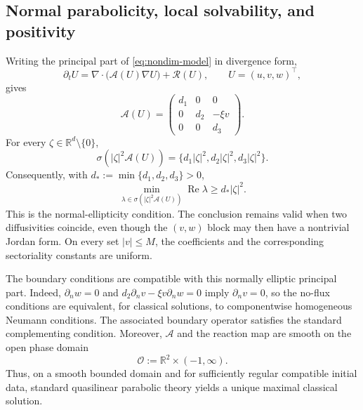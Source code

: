 \documentclass[a4paper,fleqn,longmktitle]{cas-sc}
\theoremstyle{plain}
\theoremstyle{definition}
\numberwithin{equation}{section}
\begin{document}
\subsection{Normal parabolicity, local solvability, and positivity}
\label{app:normal-parabolicity}
Writing the principal part of \eqref{eq:nondim-model} in divergence form,
\[
 \partial_tU=\nabla\cdot\bigl(\mathcal A(U)\nabla U\bigr)
 +\mathcal R(U),
 \qquad U=(u,v,w)^\top,
\]
gives
\[
\mathcal A(U)=
\begin{pmatrix}
d_1&0&0\\
0&d_2&-\xi v\\
0&0&d_3
\end{pmatrix}.
\]
For every $\zeta\in\mathbb R^d\setminus\{0\}$,
\[
 \sigma\!\left(|\zeta|^2\mathcal A(U)\right)
 =
 \{d_1|\zeta|^2,d_2|\zeta|^2,d_3|\zeta|^2\}.
\]
Consequently, with $d_*:=\min\{d_1,d_2,d_3\}>0$,
\[
 \min_{\lambda\in
 \sigma(|\zeta|^2\mathcal A(U))}
 \operatorname{Re}\lambda
 \ge d_*|\zeta|^2 .
\]
This is the normal-ellipticity condition. The conclusion
remains valid when two diffusivities coincide, even though the $(v,w)$ block
may then have a nontrivial Jordan form. On every set $|v|\le M$, the
coefficients and the corresponding sectoriality constants are uniform.

The boundary conditions are compatible with this normally elliptic principal
part. Indeed, $\partial_nw=0$ and
$d_2\partial_nv-\xi v\partial_nw=0$ imply $\partial_nv=0$, so the no-flux
conditions are equivalent, for classical solutions, to componentwise
homogeneous Neumann conditions. The associated boundary operator satisfies
the standard complementing condition. Moreover, $\mathcal A$ and the reaction
map are smooth on the open phase domain
\[
 \mathcal O:=\mathbb R^2\times(-1,\infty).
\]
Thus, on a smooth bounded domain and for sufficiently regular compatible
initial data, standard quasilinear parabolic theory
\cite{amann1993nonhomogeneous} yields a unique maximal classical solution.
\end{document}
